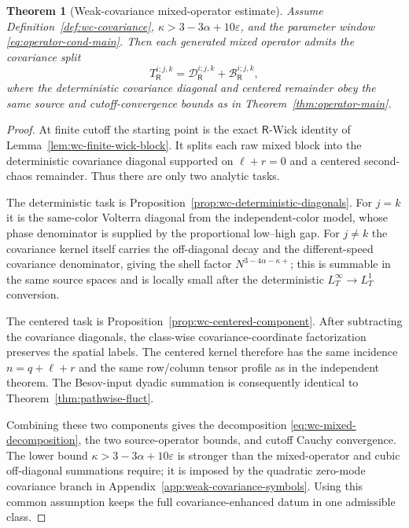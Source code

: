 \documentclass[10pt]{amsart}
\numberwithin{equation}{section}
\theoremstyle{plain}
\newtheorem{theorem}{Theorem}[section]
\theoremstyle{definition}
\theoremstyle{remark}
\newcommand{\eps}{\varepsilon}
\begin{document}
\begin{theorem}[Weak-covariance mixed-operator estimate]\label{thm:wc-mixed-operators}
Assume Definition~\ref{def:wc-covariance}, \(\kappa>3-3\alpha+10\eps\), and the parameter window \eqref{eq:operator-cond-main}.  Then each generated mixed operator admits the covariance split
\begin{equation}\label{eq:wc-mixed-decomposition}
        T_{\mathsf R}^{i;j,k}=\mathcal D_{\mathsf R}^{i;j,k}+\mathcal B_{\mathsf R}^{i;j,k},
\end{equation}
where the deterministic covariance diagonal and centered remainder obey the same source and cutoff-convergence bounds as in Theorem~\ref{thm:operator-main}.
\end{theorem}

\begin{proof}
At finite cutoff the starting point is the exact $\mathsf R$-Wick identity of Lemma~\ref{lem:wc-finite-wick-block}.  It splits each raw mixed block into the deterministic covariance diagonal supported on $\ell+r=0$ and a centered second-chaos remainder.  Thus there are only two analytic tasks.

The deterministic task is Proposition~\ref{prop:wc-deterministic-diagonals}.  For $j=k$ it is the same-color Volterra diagonal from the independent-color model, whose phase denominator is supplied by the proportional low--high gap.  For $j\ne k$ the covariance kernel itself carries the off-diagonal decay and the different-speed covariance denominator, giving the shell factor $N^{3-4\alpha-\kappa+}$; this is summable in the same source spaces and is locally small after the deterministic $L_T^\infty\to L_T^1$ conversion.

The centered task is Proposition~\ref{prop:wc-centered-component}.  After subtracting the covariance diagonals, the class-wise covariance-coordinate factorization preserves the spatial labels.  The centered kernel therefore has the same incidence $n=q+\ell+r$ and the same row/column tensor profile as in the independent theorem.  The Besov-input dyadic summation is consequently identical to Theorem~\ref{thm:pathwise-fluct}.

Combining these two components gives the decomposition \eqref{eq:wc-mixed-decomposition}, the two source-operator bounds, and cutoff Cauchy convergence.  The lower bound $\kappa>3-3\alpha+10\eps$ is stronger than the mixed-operator and cubic off-diagonal summations require; it is imposed by the quadratic zero-mode covariance branch in Appendix~\ref{app:weak-covariance-symbols}.  Using this common assumption keeps the full covariance-enhanced datum in one admissible class.
\end{proof}
\end{document}
